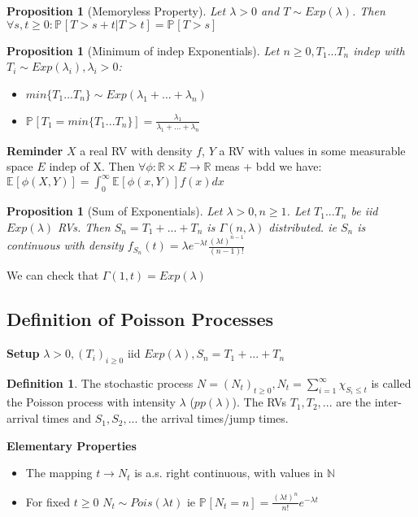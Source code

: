\documentclass[12pt]{book}
\newtheorem{prop}[theorem]{Proposition}
\theoremstyle{definition}
\newtheorem{defn}{Definition}[section]
\theoremstyle{remark}
\begin{document}
\begin{prop}[Memoryless Property]
	Let $\lambda > 0$ and $T \sim Exp(\lambda)$. Then  $\forall s,t\geq 0: \mathbb{P}_{} \left[ T>s+t | T>t \right] = \mathbb{P}_{} \left[ T>s \right] $
\end{prop}
\begin{prop}[Minimum of indep Exponentials]
	Let $n\geq 0, T_1...T_n$ indep with $T_i \sim Exp(\lambda_i), \lambda_i > 0$: 
\begin{itemize}
	\item  $min\{T_1...T_n\} \sim Exp(\lambda_1+...+\lambda_n)$
	\item $\mathbb{P}_{} \left[ T_1 = min\{T_1...T_n\} \right] = \frac{\lambda_1}{\lambda_1+...+\lambda_n}$
\end{itemize}

\end{prop}
 
\textbf{Reminder} $X$ a real RV with density $f$, $Y$ a RV with values in some measurable space $E$ indep of X. Then $\forall \phi:\mathbb{R} \times E \to \mathbb{R}$ meas + bdd we have: $\mathbb{E}_{} \left[ \phi(X,Y) \right] = \int_{0}^{\infty} \mathbb{E}_{} \left[ \phi(x,Y) \right] f(x) dx$ 

\begin{prop}[Sum of Exponentials]
	Let $\lambda > 0, n\geq 1$. Let $T_1...T_n$ be iid $Exp(\lambda)$ RVs. Then  $S_n = T_1+...+T_n$ is  $\Gamma(n, \lambda)$ distributed. ie $S_n$ is continuous with density $f_{S_n}(t)=\lambda e^{-\lambda t} \frac{(\lambda t)^{n-1}}{(n-1)!}$
\end{prop}

We can check that $\Gamma(1,t)=Exp(\lambda)$

\subsection{Definition of Poisson Processes}
\textbf{Setup}  $\lambda > 0, (T_i)_{i\geq 0}$ iid $Exp(\lambda ), S_n = T_1+...+T_n$

\begin{defn}
	The stochastic process $N=(N_t)_{t\geq 0}, N_t = \sum_{i=1}^{\infty} \chi_{S_i \leq t}$ is called the Poisson process with intensity $\lambda $ ($pp(\lambda)$). The RVs  $T_1,T_2,...$ are the inter-arrival times and  $S_1,S_2,...$ the arrival times/jump times.
\end{defn}
\noindent
\textbf{Elementary Properties}
\begin{itemize}
	\item The mapping $t \to N_t$ is a.s. right continuous, with values in $\mathbb{N}$
	\item For fixed $t\geq 0$ $N_t \sim Pois(\lambda t)$ ie $\mathbb{P}_{} \left[ N_t = n \right] = \frac{(\lambda t)^n}{n!}e^{- \lambda  t}$
\end{itemize}
\end{document}
